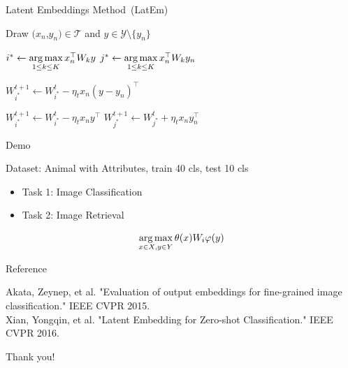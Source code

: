 \documentclass[mathserif, xcolor=table]{beamer}
\def\T{\mathcal{T}}
\def\Y{\mathcal{Y}}
\def\argmax{\mathop{\rm arg\,max}\limits}%
\def\Y{\mathcal{Y}}
\begin{document}
\begin{frame}{Latent Embeddings Method~(LatEm)}
\begin{algorithm}[H]
\small
\begin{algorithmic}[1]
\small
	\FORALL {$n=1$ to $|\T|$} 
      		\STATE  Draw $(x_n$,$y_n) \in \T$ and $y \in \Y \setminus \{y_n\}$ 
      		\pause

      			\pause

				\STATE $i^* \leftarrow \argmax\limits_{1\leq k\leq K} x_n^\top W_k y$
				\STATE $j^* \leftarrow \argmax\limits_{1\leq k\leq K} x_n^\top W_k y_n $  
				      			\pause

				\STATE $W_{i^*}^{t+1} \leftarrow W_{i^*}^{t} - \eta_t x_n (y - y_n)^\top$
				\ENDIF
				      			\pause

          			\STATE $W_{i^*}^{t+1} \leftarrow W_{i^*}^{t} - \eta_t x_n y^\top$ 
          			\STATE $W_{j^*}^{t+1} \leftarrow W_{j^*}^{t} + \eta_t x_n y_n^\top$ 
          			\ENDIF
        		\ENDIF
      \ENDFOR
    \ENDFOR
\end{algorithmic}
\caption*{Algorithm: SGD optimization of LatEm }
\label{alg:seq}
\end{algorithm}


\end{frame}


\begin{frame}{Demo}

Dataset: Animal with Attributes, train 40 cls, test 10 cls
\begin{itemize}
	\item Task 1: Image Classification
	\pause
	\item Task 2: Image Retrieval
\end{itemize}
\begin{equation*}
\argmax_{x\in X, y \in Y} \theta(x) W_i \varphi(y)
\end{equation*}
\end{frame}

\begin{frame}{Reference}

	Akata, Zeynep, et al. "Evaluation of output embeddings for fine-grained image classification." IEEE CVPR 2015. \\
	\vspace{0.2in}
	Xian, Yongqin, et al. "Latent Embedding for Zero-shot Classification." IEEE CVPR 2016.
	
\end{frame}

\begin{frame}{}
\center
\huge
Thank you!
\end{frame}
\end{document}

